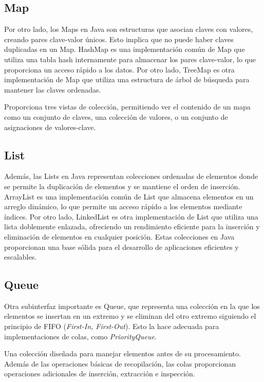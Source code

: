 \documentclass[a4paper,12pt]{article}
\begin{document}
\subsection{Map}

Por otro lado, los Maps en Java son estructuras que asocian claves con valores, creando pares clave-valor únicos. Esto implica que no puede haber claves duplicadas en un Map. HashMap es una implementación común de Map que utiliza una tabla hash internamente para almacenar los pares clave-valor, lo que proporciona un acceso rápido a los datos. Por otro lado, TreeMap es otra implementación de Map que utiliza una estructura de árbol de búsqueda para mantener las claves ordenadas.

Proporciona tres vistas de colección, permitiendo ver el contenido de un mapa como un conjunto de claves, una colección de valores, o un conjunto de asignaciones de valores-clave.\cite{map}

\subsection{List}

Además, las Lists en Java representan colecciones ordenadas de elementos donde se permite la duplicación de elementos y se mantiene el orden de inserción. ArrayList es una implementación común de List que almacena elementos en un arreglo dinámico, lo que permite un acceso rápido a los elementos mediante índices. Por otro lado, LinkedList es otra implementación de List que utiliza una lista doblemente enlazada, ofreciendo un rendimiento eficiente para la inserción y eliminación de elementos en cualquier posición. Estas colecciones en Java proporcionan una base sólida para el desarrollo de aplicaciones eficientes y escalables.

\subsection{Queue}

Otra subinterfaz importante es Queue, que representa una colección en la que los elementos se insertan en un extremo y se eliminan del otro extremo siguiendo el principio de FIFO (\textit{First-In, First-Out}). Esto la hace adecuada para implementaciones de colas, como \textit{PriorityQueue}.

Una colección diseñada para manejar elementos antes de su procesamiento. Además de las operaciones básicas de recopilación, las colas proporcionan operaciones adicionales de inserción, extracción e inspección. \cite{queue}
\end{document}
